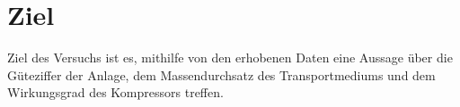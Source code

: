\section{Ziel}
\label{sec:Ziel}
\setlength{\parindent}{0pt}
Ziel des Versuchs ist es, mithilfe von den erhobenen Daten eine Aussage über die Güteziffer 
der Anlage, dem Massendurchsatz des Transportmediums und dem Wirkungsgrad des Kompressors treffen.